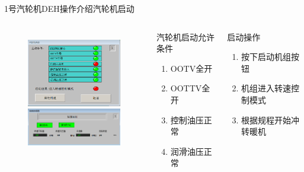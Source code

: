 \documentclass[12pt,hyperref={CJKbookmarks=true}]{beamer} %
\begin{document}
\begin{frame}{1号汽轮机DEH操作介绍}{汽轮机启动}
  		\begin{columns}
\begin{figure}
\includegraphics[angle=0,width=150pt,trim=0 0 0 0,clip]{pic/qidong.png}\\
\includegraphics[angle=0,width=150pt,trim=0 0 0 0,clip]{pic/zhuansukongzhi.png}
	
\end{figure}
\begin{block}{汽轮机启动允许条件}
			\begin{enumerate}
				\item OOTV全开
				\item OOTTV全开
				\item 控制油压正常
				\item 润滑油压正常
				\end{enumerate}
\end{block}
\begin{exampleblock}{启动操作}
			\begin{enumerate}
				\item 按下启动机组按钮
				\item 机组进入转速控制模式
				\item 根据规程开始冲转暖机
				\end{enumerate}
\end{exampleblock}
		\end{columns}
\end{frame}
\end{document}
